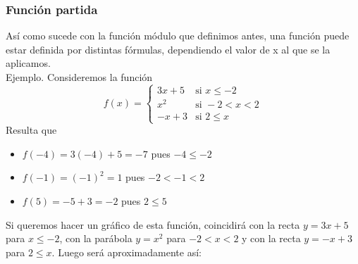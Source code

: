\documentclass[Análisis.root.tex]{subfiles}
\begin{document}
        \subsubsection{Función partida}
        Así como sucede con la función módulo que definimos antes, una función puede estar definida por distintas fórmulas, dependiendo el valor de x al que se la aplicamos.\\
        Ejemplo. Consideremos la función
        \[f(x)=
            \begin{cases}
                3x+5 & \text{si }x\leq -2\\
                x^2 & \text{si }-2<x<2\\
                -x+3 & \text{si }2\leq x
            \end{cases}
        \]
        Resulta que
        \begin{itemize}
            \item \(f(-4)=3(-4)+5=-7\) pues \(-4\leq -2\)
            \item \(f(-1)=(-1)^2=1\) pues \(-2< -1<2\)
            \item \(f(5)=-5+3=-2\) pues \(2\leq 5\)
        \end{itemize}
        Si queremos hacer un gráfico de esta función, coincidirá con la recta \(y =3x+5\) para \(x\leq−2\), con la parábola \(y=x^2\) para \(−2<x<2\) y con la recta \(y=−x+3\) para \(2\leq x\). Luego será aproximadamente así:
        \begin{center}
        \end{center}
\end{document}
